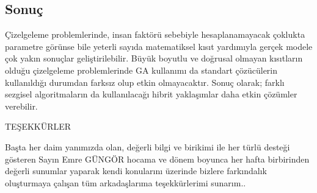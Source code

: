\documentclass[12pt, a4paper]{article}
\begin{document}
\begin{flushleft}
\section{Sonuç}

Çizelgeleme problemlerinde, insan faktörü sebebiyle hesaplanamayacak çoklukta parametre 
görünse bile yeterli sayıda matematiksel kısıt yardımıyla gerçek modele çok yakın sonuçlar 
geliştirilebilir. Büyük boyutlu ve doğrusal olmayan kısıtların olduğu çizelgeleme 
problemlerinde  GA kullanımı da standart 
çözücülerin kullanıldığı durumdan farksız olup etkin olmayacaktır. Sonuç olarak; farklı sezgisel algoritmaların 
da kullanılacağı hibrit yaklaşımlar daha etkin çözümler verebilir. \\





\begin{center}
	TEŞEKKÜRLER

 \end{center}
\begin{center}
	Başta her daim yanımızda olan, değerli bilgi ve birikimi ile her türlü desteği gösteren Sayın Emre GÜNGÖR hocama ve dönem boyunca her hafta birbirinden değerli  sunumlar yaparak 
	kendi konularını üzerinde bizlere farkındalık oluşturmaya çalışan tüm arkadaşlarıma 
	teşekkürlerimi sunarım..
\end{center}











	
	
	
	

	

\end{flushleft}

 
\end{document}
